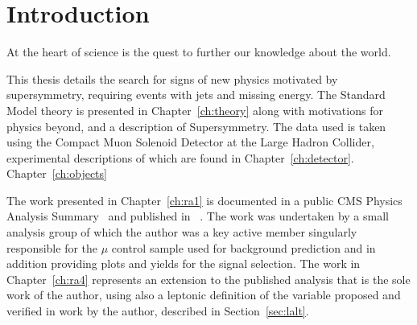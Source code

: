 \setcounter{equation}{0}
\setcounter{figure}{0}
\setcounter{table}{0}

\chapter{\label{chapter1} Introduction}

At the heart of science is the quest to further our knowledge about the world. 


This thesis details the search for signs of new physics motivated by supersymmetry, requiring events with jets and missing energy. The Standard Model theory is presented in Chapter~\ref{ch:theory} along with motivations for physics beyond, and a description of Supersymmetry. The data used is taken using the Compact Muon Solenoid Detector at the Large Hadron Collider, experimental descriptions of which are found in Chapter~\ref{ch:detector}. Chapter~\ref{ch:objects} 


The work presented in Chapter~\ref{ch:ra1} is documented in a public CMS Physics Analysis Summary~\cite{} and published in ~\cite{1}. The work was undertaken by a small analysis group of which the author was a key active member singularly responsible for the $\mu$ control sample used for background prediction and in addition providing plots and yields for the signal selection. The work in Chapter~\ref{ch:ra4} represents an extension to the published analysis that is the sole work of the author, using also a leptonic definition of the \alt variable proposed and verified in work by the author, described in Section~\ref{sec:lalt}. 



